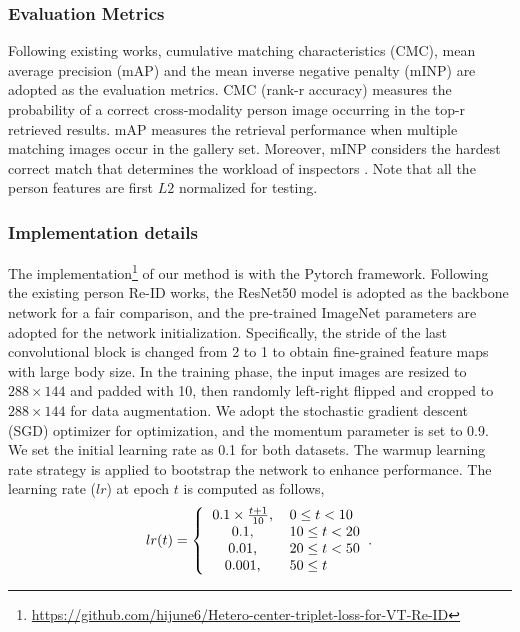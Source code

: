 \documentclass[journal]{IEEEtran}
\begin{document}
\subsubsection{Evaluation Metrics}
Following existing works, cumulative matching characteristics (CMC), mean average precision (mAP) and the mean inverse negative penalty (mINP) are adopted as the evaluation metrics. CMC (rank-r accuracy) measures the probability of a correct cross-modality person image occurring in the top-r retrieved results. mAP measures the retrieval performance when multiple matching images occur in the gallery set. Moreover, mINP considers the hardest correct match that determines the workload of inspectors \cite{Ye2020DeepLF}.
Note that all the person features are first $L2$ normalized for testing.

\subsubsection{Implementation details}
The implementation\footnote{\url{https://github.com/hijune6/Hetero-center-triplet-loss-for-VT-Re-ID}} of our method is with the Pytorch framework. Following the existing person Re-ID works, the ResNet50 model is adopted as the backbone network for a fair comparison, and the pre-trained ImageNet parameters are adopted for the network initialization. Specifically, the stride of the last convolutional block is changed from 2 to 1 to obtain fine-grained feature maps with large body size. In the training phase, the input images are resized to $288 \times 144$ and padded with 10, then randomly left-right flipped and cropped to $288 \times 144$ for data augmentation.
We adopt the stochastic gradient descent (SGD) optimizer for optimization, and the momentum parameter is set to 0.9. We set the initial learning rate as 0.1 for both datasets. The warmup learning rate strategy is applied to bootstrap the network to enhance performance. The learning rate ($lr$) at epoch $t$ is computed as follows,
\begin{align}
    lr(t) =
    \left\{
    \begin{tabular}{cl}
        $ 0.1 \times \frac{t+1}{10}$, & $0 \leq t < 10$ \\
        $0.1$, & $10 \leq t < 20$ \\
        $0.01$, & $20 \leq t < 50$ \\
        $0.001$, & $50 \leq t $
    \end{tabular}.
    \right.
\end{align}
\end{document}
